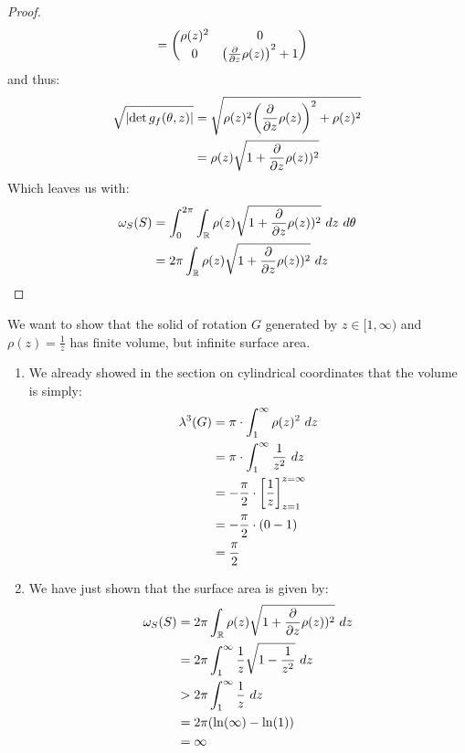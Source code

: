 \begin{proof}
\begin{align*}
		&=
		\begin{pmatrix}
			\rho(z)^2 & 0\\
			0 & \qty(\pdv{z} \rho(z))^2 + 1
		\end{pmatrix}
	\end{align*}
	and thus:
	\begin{align*}
		\sqrt{\abs{\det g_f(\theta,z)}} 
		&= \sqrt{\rho(z)^2\qty(\pdv{z} \rho(z))^2 + \rho(z)^2}\\
		&= \rho(z)\sqrt{1 + \pdv{z} \rho(z))^2}
	\end{align*}
	Which leaves us with:
	\begin{align*}
		\omega_S(S) 
		&= \int_0^{2\pi} \int_{\mathbb{R}} \rho(z)\sqrt{1 + \pdv{z} \rho(z))^2} ~dz ~d\theta\\
		&= 2\pi \int_{\mathbb{R}} \rho(z)\sqrt{1 + \pdv{z} \rho(z))^2} ~dz
	\end{align*}
\end{proof}
\begin{example}
	We want to show that the solid of rotation $G$ generated by $z \in [1,\infty)$ and $\rho(z) = \frac{1}{z}$ has finite volume, but infinite surface area.
	\begin{enumerate}
		\item We already showed in the section on cylindrical coordinates that the volume is simply:
		\begin{align*}
			\lambda^3(G) 
			&= \pi \cdot \int_1^\infty \rho(z)^2 ~dz\\
			&= \pi \cdot \int_1^\infty \frac{1}{z^2} ~dz\\
			&= -\frac{\pi}{2} \cdot \qty[\frac{1}{z}]_{z = 1}^{z = \infty}\\
			&= -\frac{\pi}{2} \cdot (0 - 1)\\ 
			&= \frac{\pi}{2}
		\end{align*}
		\item We have just shown that the surface area is given by:
		\begin{align*}
			\omega_S(S) 
			&= 2\pi \int_{\mathbb{R}} \rho(z)\sqrt{1 + \pdv{z} \rho(z))^2} ~dz\\
			&= 2\pi \int_{1}^\infty \frac{1}{z}\sqrt{1 - \frac{1}{z^2}} ~dz\\
			&> 2\pi \int_{1}^\infty \frac{1}{z} ~dz\\
			&= 2\pi (\ln(\infty) - \ln(1))\\
			&= \infty
		\end{align*}
	\end{enumerate}
\end{example}
